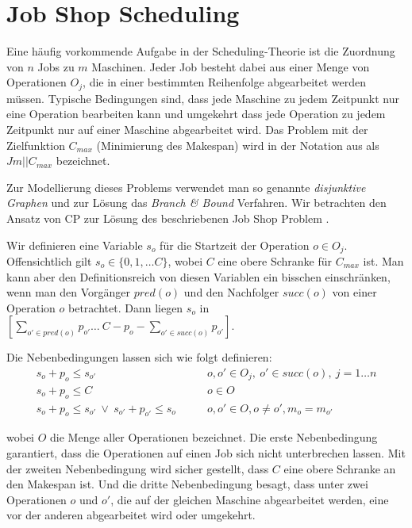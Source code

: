 \section{Job Shop Scheduling}

Eine häufig vorkommende Aufgabe in der Scheduling-Theorie ist die Zuordnung von $n$ Jobs zu $m$ Maschinen. Jeder Job besteht dabei aus einer Menge von Operationen $O_j$, die in einer bestimmten Reihenfolge abgearbeitet werden müssen. Typische Bedingungen sind, dass jede Maschine zu jedem Zeitpunkt nur eine Operation bearbeiten kann und umgekehrt dass jede Operation zu jedem Zeitpunkt nur auf einer Maschine abgearbeitet wird. Das Problem mit der Zielfunktion $C_{max}$ (Minimierung des Makespan) wird in der 	Notation aus \cite{Pinedo} als $Jm||C_{max}$ bezeichnet.

Zur Modellierung dieses Problems verwendet man so genannte {\it disjunktive Graphen} und zur Lösung das {\it Branch \& Bound} Verfahren. Wir betrachten den Ansatz von CP zur Lösung des beschriebenen Job Shop Problem \citep[vgl.][]{CSP}.

Wir definieren eine Variable $s_o$ für die Startzeit der Operation $o\in O_j$. Offensichtlich gilt $s_o\in \{0,1,\dots C\}$, wobei $C$ eine obere Schranke für $C_{max}$ ist. Man kann aber den Definitionsreich von diesen Variablen ein bisschen einschränken, wenn man den Vorgänger $pred(o)$ und den Nachfolger $succ(o)$ von einer Operation $o$ betrachtet. Dann liegen $s_o$ in $[\sum_{o'\in pred(o)}p_{o'}\dots\ C-p_o-\sum_{o'\in succ(o)}p_{o'}]$.

Die Nebenbedingungen lassen sich wie folgt definieren:
\begin{align}
  s_o + p_o \le s_{o'} &\qquad  o,o'\in O_j,\ o'\in succ(o),\ j=1\dots n \nonumber \\
  s_o + p_o \le C &\qquad  o\in O \nonumber \\
  s_o + p_o \le s_{o'}\ \vee\ s_{o'} + p_{o'} \le s_{o} &\qquad o,o'\in O, o\not=o', m_o=m_{o'} \nonumber 
\end{align}

wobei $O$ die Menge aller Operationen bezeichnet.
Die erste Nebenbedingung garantiert, dass die Operationen auf einen Job sich nicht unterbrechen lassen. Mit der zweiten Nebenbedingung wird sicher gestellt, dass $C$ eine obere Schranke an den Makespan ist. Und die dritte Nebenbedingung besagt, dass unter zwei Operationen $o$ und $o'$, die auf der gleichen Maschine abgearbeitet werden, eine vor der anderen abgearbeitet wird oder umgekehrt.

